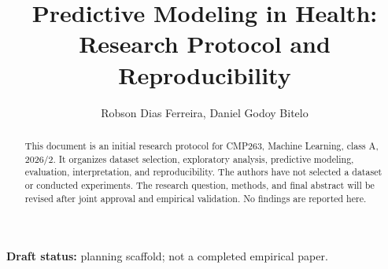 \documentclass[12pt]{article}
\title{Predictive Modeling in Health:\\Research Protocol and Reproducibility}
\author{Robson Dias Ferreira\inst{1}, Daniel Godoy Bitelo\inst{1}}
\begin{document}
\maketitle
\begin{abstract}
This document is an initial research protocol for CMP263, Machine Learning,
class A, 2026/2. It organizes dataset selection, exploratory analysis,
predictive modeling, evaluation, interpretation, and reproducibility.
The authors have not selected a dataset or conducted experiments.
The research question, methods, and final abstract will be revised after
joint approval and empirical validation. No findings are reported here.
\end{abstract}
\noindent\textbf{Draft status:} planning scaffold; not a completed empirical paper.










\end{document}
